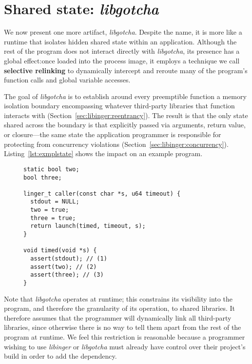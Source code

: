 \section{Shared state: \textit{libgotcha}}
\label{sec:libgotcha}

We now present one more artifact, \textit{libgotcha}.
Despite the name, it is more like a runtime that isolates hidden shared state
within an application.  Although the rest of the
program does not interact directly with \textit{libgotcha}, its presence has a
global effect:\@ once loaded into the process image, it employs a technique we call
\textbf{selective relinking} to dynamically intercept and reroute many of the
program's function
calls and global variable accesses.

The goal of \textit{libgotcha} is to establish around every preemptible function a
memory isolation boundary encompassing whatever third-party libraries that function
interacts with (Section~\ref{sec:libinger:reentrancy}).  The result is that the only
state shared across the boundary is that explicitly passed via arguments,
return value, or closure---the same state the application programmer is responsible
for protecting from concurrency violations (Section~\ref{sec:libinger:concurrency}).
Listing~\ref{lst:exmplstate} shows the impact on an example program.

\begin{figure}
\begin{lstlisting}[label=lst:exmplstate,caption=Demo of isolated \textnormal{(1)} vs.\ shared \textnormal{(2\&3)} state]
static bool two;
bool three;

linger_t caller(const char *s, u64 timeout) {
  stdout = NULL;
  two = true;
  three = true;
  return launch(timed, timeout, s);
}

void timed(void *s) {
  assert(stdout); // (1)
  assert(two); // (2)
  assert(three); // (3)
}
\end{lstlisting}
\end{figure}

Note that \textit{libgotcha} operates at runtime; this constrains its visibility
into the program, and therefore the granularity of its operation, to shared
libraries.  It therefore
assumes that the programmer will dynamically link all third-party libraries, since
otherwise there is no way to tell them apart from the rest of the program at runtime.
We feel this restriction is reasonable because a programmer wishing to use
\textit{libinger} or \textit{libgotcha} must already have control over their
project's build in order to add the dependency.

